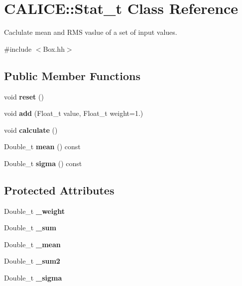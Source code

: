 \section{C\-A\-L\-I\-C\-E\-:\-:Stat\-\_\-t Class Reference}
\label{classCALICE_1_1Stat__t}


Caclulate mean and R\-M\-S vaslue of a set of input values.  




{\ttfamily \#include $<$Box.\-hh$>$}

\subsection*{Public Member Functions}
\begin{DoxyCompactItemize}
\item 
void {\bfseries reset} ()\label{classCALICE_1_1Stat__t_acf6555a00a6567e5f3bd64b286147105}

\item 
void {\bfseries add} (Float\-\_\-t value, Float\-\_\-t weight=1.)\label{classCALICE_1_1Stat__t_a7b345a82593acd04ae8ec24093e60e3b}

\item 
void {\bfseries calculate} ()\label{classCALICE_1_1Stat__t_a3e81369ea9d0f2603dad3a3bb6d20209}

\item 
Double\-\_\-t {\bfseries mean} () const \label{classCALICE_1_1Stat__t_a324b40b1f06f41039dd0a9d72055f31e}

\item 
Double\-\_\-t {\bfseries sigma} () const \label{classCALICE_1_1Stat__t_a9a287b6c964273a4d2b246de7a99d7c5}

\end{DoxyCompactItemize}
\subsection*{Protected Attributes}
\begin{DoxyCompactItemize}
\item 
Double\-\_\-t {\bfseries \-\_\-weight}\label{classCALICE_1_1Stat__t_a770e755b2931194f594656e1e5cb7834}

\item 
Double\-\_\-t {\bfseries \-\_\-sum}\label{classCALICE_1_1Stat__t_af46eefdce2686e0d5d94fe9361a404df}

\item 
Double\-\_\-t {\bfseries \-\_\-mean}\label{classCALICE_1_1Stat__t_a4793d99948d5879898302766cfa1f122}

\item 
Double\-\_\-t {\bfseries \-\_\-sum2}\label{classCALICE_1_1Stat__t_a9940d9384886fc045c90457759225bbc}

\item 
Double\-\_\-t {\bfseries \-\_\-sigma}\label{classCALICE_1_1Stat__t_a2594c72a5f89186db65cf86195edec43}

\end{DoxyCompactItemize}
